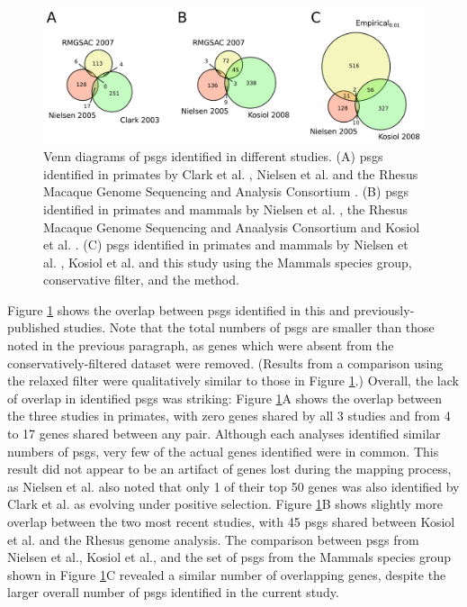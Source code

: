 \begin{figure}
\centering
\includegraphics[scale=0.3]{Figs/pub_psg_venn.pdf}
\caption{Venn diagrams of \acp{psg} identified in different
  studies. (A) \acp{psg} identified in primates by Clark et
  al. \citeyearpar{Clark2003}, Nielsen et
  al. \citeyearpar{Nielsen2005} and the Rhesus Macaque Genome
  Sequencing and Analysis Consortium \citeyearpar{Macaque2007}. (B)
  \acp{psg} identified in primates and mammals by Nielsen et
  al. \citeyearpar{Nielsen2005}, the Rhesus Macaque Genome Sequencing
  and Anaalysis Consortium \citeyearpar{Macaque2007} and Kosiol et
  al. \citeyearpar{Kosiol2008}. (C) \acp{psg} identified in primates
  and mammals by Nielsen et al. \citeyearpar{Nielsen2005}, Kosiol et
  al. \citeyearpar{Kosiol2008} and this study using the Mammals
  species group, conservative filter, and the \psgeone method.}
\label{fig_pub_psg_venn}
\end{figure}

Figure \ref{fig_pub_psg_venn} shows the overlap between \acp{psg}
identified in this and previously-published studies. Note that the
total numbers of \acp{psg} are smaller than those noted in the
previous paragraph, as genes which were absent from the
conservatively-filtered dataset were removed. (Results from a
comparison using the relaxed filter were qualitatively similar to
those in Figure \ref{fig_pub_psg_venn}.) Overall, the lack of overlap
in identified \acp{psg} was striking: Figure \ref{fig_pub_psg_venn}A
shows the overlap between the three studies in primates, with zero
genes shared by all 3 studies and from 4 to 17 genes shared between
any pair. Although each analyses identified similar numbers of
\acp{psg}, very few of the actual genes identified were in
common. This result did not appear to be an artifact of genes lost
during the mapping process, as Nielsen et al. also noted that only 1
of their top 50 genes was also identified by Clark et
al. \citeyearpar{2003} as evolving under positive selection. Figure
\ref{fig_pub_psg_venn}B shows slightly more overlap between the two
most recent studies, with 45 \acp{psg} shared between Kosiol et
al. and the Rhesus genome analysis. The comparison between \acp{psg}
from Nielsen et al., Kosiol et al., and the set of \psgeone \acp{psg}
from the Mammals species group shown in Figure \ref{fig_pub_psg_venn}C
revealed a similar number of overlapping genes, despite the larger
overall number of \acp{psg} identified in the current study.

